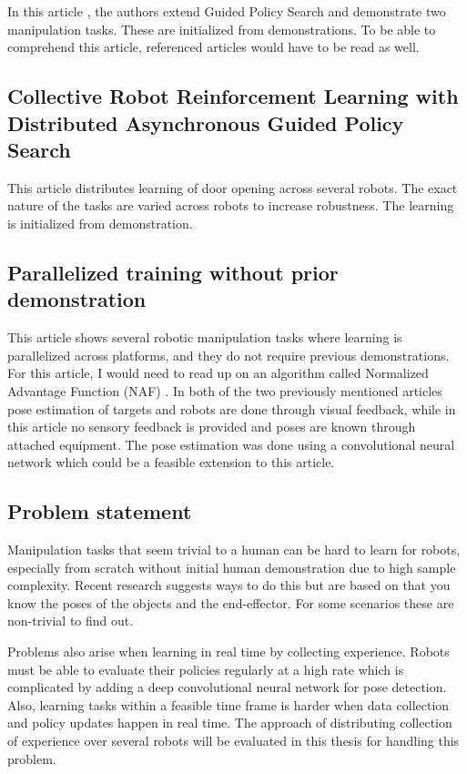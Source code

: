 In this article \cite{chebotar2016path}, the authors extend Guided Policy
Search and demonstrate two manipulation tasks. These are initialized from
demonstrations. To be able to comprehend this article, referenced articles
\cite{levine2016end,theodorou2010generalized,montgomery2016guided} would have
to be read as well.

\subsection{Collective Robot Reinforcement Learning with Distributed
               Asynchronous Guided Policy Search}

This article \cite{yahya2016collective} distributes learning of
door opening across several robots. The exact nature of the tasks
are varied across robots to increase robustness. The learning is
initialized from demonstration.

\subsection{Parallelized training without prior demonstration}

This article \cite{gu2016deep} shows several robotic manipulation tasks where
learning is parallelized across platforms, and they do not require previous
demonstrations.  For this article, I would need to read up on an algorithm
called Normalized Advantage Function (NAF) \cite{gu2016continuous}. In both of
the two previously mentioned articles
\cite{chebotar2016path,yahya2016collective} pose estimation of targets and
robots are done through visual feedback, while in this article
\cite{gu2016deep} no sensory feedback is provided and poses are known through
attached equipment. The pose estimation was done using a convolutional neural
network which could be a feasible extension to this article.

\subsection{Problem statement}

Manipulation tasks that seem trivial to a human can be hard to learn for
robots, especially from scratch without initial human demonstration due to high
sample complexity. Recent research suggests ways to do this but are based on
that you know the poses of the objects and the end-effector. For some scenarios
these are non-trivial to find out.

Problems also arise when learning in real time by collecting experience. Robots
must be able to evaluate their policies regularly at a high rate which is
complicated by adding a deep convolutional neural network for pose detection.
Also, learning tasks within a feasible time frame is harder when data
collection and policy updates happen in real time. The approach of
distributing collection of experience over several robots will be evaluated in
this thesis for handling this problem.

